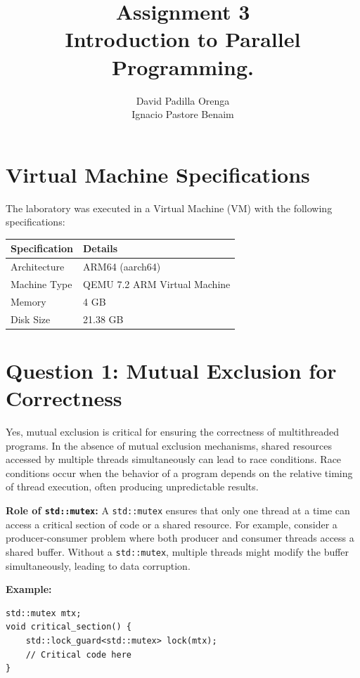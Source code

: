 \documentclass{article}
\title{Assignment 3 \\ \small Introduction to Parallel Programming.}
\author{David Padilla Orenga\\ Ignacio Pastore Benaim}
\date{}
\begin{document}
\maketitle

\section*{Virtual Machine Specifications}
The laboratory was executed in a Virtual Machine (VM) with the following specifications:

\begin{table}[h!]
\centering
\begin{tabular}{|l|l|}
\hline
\textbf{Specification} & \textbf{Details} \\ \hline
Architecture           & ARM64 (aarch64)  \\ \hline
Machine Type           & QEMU 7.2 ARM Virtual Machine \\ \hline
Memory                 & 4 GB             \\ \hline
Disk Size              & 21.38 GB         \\ \hline
\end{tabular}
\end{table}

\section*{Question 1: Mutual Exclusion for Correctness}
Yes, mutual exclusion is critical for ensuring the correctness of multithreaded programs. In the absence of mutual exclusion mechanisms, shared resources accessed by multiple threads simultaneously can lead to race conditions. Race conditions occur when the behavior of a program depends on the relative timing of thread execution, often producing unpredictable results.

\textbf{Role of \texttt{std::mutex}:}  
A \texttt{std::mutex} ensures that only one thread at a time can access a critical section of code or a shared resource. For example, consider a producer-consumer problem where both producer and consumer threads access a shared buffer. Without a \texttt{std::mutex}, multiple threads might modify the buffer simultaneously, leading to data corruption.

\textbf{Example:}  
\begin{verbatim}
std::mutex mtx;
void critical_section() {
    std::lock_guard<std::mutex> lock(mtx);
    // Critical code here
}
\end{verbatim}
\end{document}
